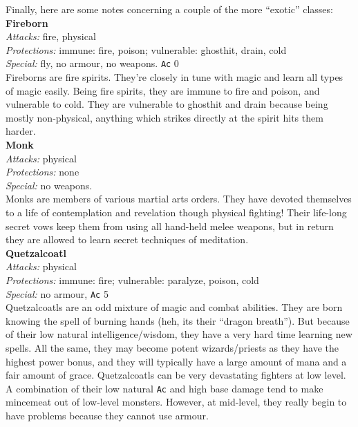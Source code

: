 Finally, here are some notes concerning a couple of the more ``exotic'' classes:\\ 
 
\noindent{$\bullet$} {\bf Fireborn} \\ 
{\sl Attacks:} fire, physical \\ 
{\sl Protections:} immune: fire, poison; vulnerable: ghosthit, drain, cold \\ 
{\sl Special:} fly, no armour, no weapons. {\tt Ac} 0 \\ 
Fireborns are fire spirits. They're closely in tune with
magic and learn all types of magic easily. 
Being fire spirits, they are
immune to fire and poison, and vulnerable to cold. They are vulnerable to
ghosthit and drain because being mostly non-physical, anything which strikes
directly at the spirit hits them harder. \\ 

\noindent{$\bullet$} {\bf Monk} \\ 
{\sl Attacks:} physical \\ 
{\sl Protections:} none \\ 
{\sl Special:} no weapons. \\ 
Monks are members of various martial arts orders. They have devoted themselves to
a life of contemplation and revelation though physical fighting! Their
life-long secret vows keep them from using all hand-held melee weapons, 
but in return they are allowed to learn secret techniques of meditation. \\ 

\noindent{$\bullet$} {\bf Quetzalcoatl} \\ 
{\sl Attacks:} physical \\ 
{\sl Protections:} immune: fire; vulnerable: paralyze, poison, cold \\ 
{\sl Special:} no armour, {\tt Ac} 5 \\ 
Quetzalcoatls are an odd mixture of magic and combat abilities. They are
born knowing the spell of burning hands (heh, its their ``dragon breath''). 
But because of their low natural intelligence/wisdom, they have a very hard 
time learning new spells. All the same, they may become potent 
wizards/priests as they have the highest power bonus, and they will 
typically have a large amount of mana and a fair amount of grace. 
Quetzalcoatls can be very
devastating fighters at low level. A combination of  their low natural {\tt Ac} 
and high base damage tend to make mincemeat
out of low-level monsters. However, at mid-level, they really begin to have
problems because they cannot use armour. \\ 
 
